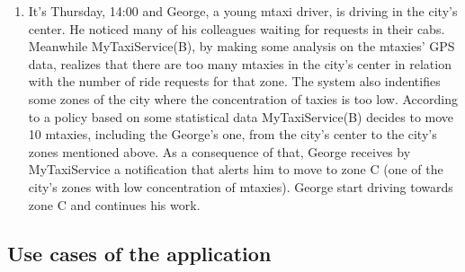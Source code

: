 \documentclass[11pt,titlepage]{article} %
\begin{document}
\begin{enumerate}
	    \item It's Thursday, 14:00 and George, a young mtaxi driver, is driving in the city's center.
	       He noticed many of his colleagues waiting for requests in their cabs.
	       Meanwhile MyTaxiService(B), by making some analysis on the mtaxies' GPS data, realizes that there are too many mtaxies
	       in the city's center in relation with the number of ride requests for that zone. The system also indentifies
	       some zones of the city where the concentration of taxies is too low. According to a policy based on some statistical data
	       MyTaxiService(B) decides to move 10 mtaxies, including the George's one, from the city's center to the city's zones mentioned above.
	       As a consequence of that, George receives by MyTaxiService a notification that alerts him to move to zone C (one of the city's zones
	       with low concentration of mtaxies). George start driving towards zone C and continues his work.
	\end{enumerate}
	\newpage

    \subsection{Use cases of the application}
\end{document}
